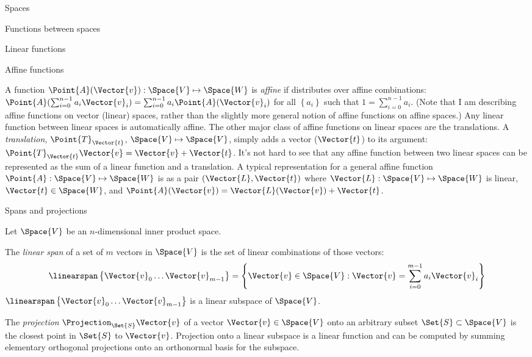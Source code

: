 \begin{plSection}{Spaces}
\begin{plSection}{Functions between spaces}
\begin{plSection}{Linear functions}
\begin{itemize}
\end {itemize}

\end{plSection}%
\begin{plSection}{Affine functions}
\label{sec:affine-functions}

A function $\Point{A}(\Vector{v}):\Space{V} \mapsto \Space{W}$
is \textit{affine} if distributes over affine combinations:
$\Point{A}(\sum_{i=0}^{n-1} a_i \Vector{v}_i) = \sum_{i=0}^{n-1} a_i \Point{A}(\Vector{v}_i) $
for all $\left\{a_i\right\}$ such that $1 = \sum_{i=0}^{n-1} a_i$.
(Note that I am describing affine functions on vector (linear) spaces,
rather than the slightly more general notion of affine functions on affine spaces.)
Any linear function between linear spaces is automatically affine.
The other major class of affine functions on linear spaces are the translations.
A \textit{translation,} $\Point{T}_{\Vector{t}}$, $\Space{V} \mapsto \Space{V}$,
simply adds a vector ($\Vector{t}$) to its argument:
$\Point{T}_{\Vector{t}} \Vector{v} = \Vector{v} + \Vector{t}$.
It's not hard to see that any affine function between two linear spaces
can be represented as the sum of a linear function and a translation.
A typical representation for a general affine function $\Point{A} : \Space{V} \mapsto \Space{W}$
is as a pair $(\Vector{L},\Vector{t})$ where $\Vector{L} : \Space{V} \mapsto \Space{W}$ is linear,
$\Vector{t} \in \Space{W}$, and $\Point{A}(\Vector{v}) = \Vector{L}(\Vector{v}) + \Vector{t}$.

\end{plSection}%
\begin{plSection}{Spans and projections}
\label{sec:spans-and-projections}

Let $\Space{V}$ be an $n$-dimensional inner product space.

The \textit{linear span} of a set of $m$ vectors in $\Space{V}$
is the set of linear combinations of those vectors:
\begin{equation}
\linearspan\left\{ \Vector{v}_0 \ldots \Vector{v}_{m-1} \right\} = \left\{\Vector{v} \in \Space{V} : \Vector{v} = \sum_{i=0}^{m-1} a_i \Vector{v}_i\right\}
\end{equation}
$\linearspan\left\{ \Vector{v}_0 \ldots \Vector{v}_{m-1} \right\}$ is a linear subspace of $\Space{V}$.

The \textit{projection} $\Projection_{\Set{S}} \Vector{v}$ of a vector $\Vector{v} \in \Space{V}$
onto an arbitrary subset $\Set{S} \subset \Space{V}$
is the closest point in $\Set{S}$ to $\Vector{v}$.
Projection onto a linear subspace is a linear function and
can be computed by summing
elementary orthogonal projections onto an orthonormal basis for the subspace.


\end{plSection}
\end{plSection}
\end{plSection}
